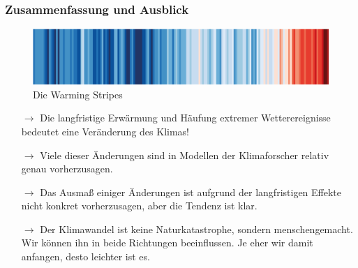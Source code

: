 \begin{frame}
	\frametitle{Zusammenfassung und Ausblick}
	\begin{figure}
		\centering
		\includegraphics[width=\linewidth]{bilder/s4f-warming-stripes}
		\caption{Die Warming Stripes}
	\end{figure}
	\begin{itemize}
	\item[$\rightarrow$] Die langfristige Erwärmung und Häufung extremer Wetterereignisse bedeutet eine Veränderung des Klimas!
	\item[$\rightarrow$] Viele dieser Änderungen sind in Modellen der Klimaforscher relativ genau vorherzusagen.
	\item[$\rightarrow$] Das Ausmaß einiger Änderungen ist aufgrund der langfristigen Effekte nicht konkret vorherzusagen, aber die Tendenz ist klar.
	\item[$\rightarrow$] Der Klimawandel ist keine Naturkatastrophe, sondern menschengemacht. Wir können ihn in beide Richtungen beeinflussen. Je eher wir damit anfangen, desto leichter ist es.
	\end{itemize}

\end{frame}
